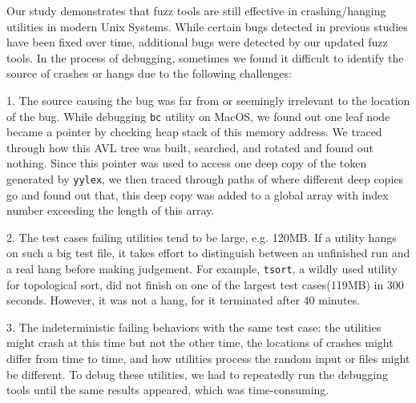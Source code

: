 
Our study demonstrates that fuzz tools are still effective in crashing/hanging utilities in modern Unix Systems. While certain bugs detected in previous studies have been fixed over time, additional bugs were detected by our updated fuzz tools. In the process of debugging, sometimes we found it difficult to identify the source of crashes or hangs due to the following challenges:

1. The source causing the bug was far from or seemingly irrelevant to the location of the bug. While debugging \texttt{bc} utility on MacOS, we found out one leaf node became a pointer by checking heap stack of this memory address. We traced through how this AVL tree was built, searched, and rotated and found out nothing. Since this pointer was used to access one deep copy of the token generated by \texttt{yylex}, we then traced through paths of where different deep copies go and found out that, this deep copy was added to a global array with index number exceeding the length of this array. 

2. The test cases failing utilities tend to be large, e.g. 120MB. If a utility hangs on such a big test file, it takes effort to distinguish between an unfinished run and a real hang before making judgement. For example, \texttt{tsort}, a wildly used utility for topological sort, did not finish on one of the largest test cases(119MB) in 300 seconds. However, it was not a hang, for it terminated after 40 minutes. 

3. The indeterministic failing behaviors with the same test case: the utilities might crash at this time but not the other time, the locations of crashes might differ from time to time, and how utilities process the random input or files might be different. To debug these utilities, we had to repeatedly run the debugging tools until the same results appeared, which was time-consuming.




